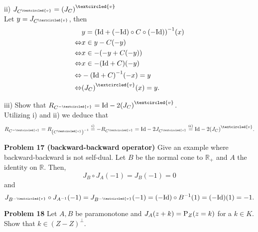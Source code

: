 \documentclass{scrartcl}
\newcommand{\R}{\mathbb{R}}
\theoremstyle{plain}
\theoremstyle{remark}
\newcommand{\Id}{\textup{Id}}
\renewcommand{\P}{\textup{P}}
\newcommand{\ov}{\textcircled{v}}
\begin{document}
ii) $J_{C^{\ov}} = {(J_{C})}^{\ov}$ \\
Let $y= J_{C^{\ov}}$, then
\begin{equation}
  \begin{aligned}
    &y= {(\Id + (-\Id) \circ C \circ (-\Id))}^{-1}(x) \\
    \Leftrightarrow& x \in y - C(-y) \\
    \Leftrightarrow& x \in - ( -y + C(-y)) \\
    \Leftrightarrow& x \in - {(\Id + C)}(-y) \\
    \Leftrightarrow& -{(\Id + C)}^{-1}(-x) = y \\
    \Leftrightarrow& {(J_{C})}^{\ov}(x) = y.
  \end{aligned}
\end{equation}

iii) Show that $R_{C^{-\ov}} = \Id - 2{(J_{C})}^{\ov}$.\\
Utilizing i) and ii) we deduce that
\begin{equation}
  R_{C^{-\ov}} = R_{\left(C^{\ov}\right)^{-1}} \overset{i)}{=} - R_{C^{\ov}} = \Id - 2 J_{C^{\ov}} \overset{ii)}{=} \Id - 2 {(J_{C})}^{\ov}.
\end{equation}



\textbf{Problem 17 (backward-backward operator)} Give an example where backward-backward is not self-dual.
Let $B$ be the normal cone to $\R_{+}$ and $A$ the identity on $\R$.
Then, 
\begin{equation}
  J_{B} \circ J_{A} (-1) = J_{B} (-1) = 0
\end{equation}
and
\begin{equation}
  J_{B^{-\ov}} \circ J_{A^{-1}} (-1) = J_{B^{-\ov}} (-1) = (-\Id) \circ B^{-1} (1) = (-\Id) (1) = -1.
\end{equation}


\textbf{Problem 18} Let $A,B$ be paramonotone and $J_A(z+k) = \P_Z(z=k)$ for a $k \in K$. Show that $k \in (Z -Z)^{\perp}$.
\end{document}

